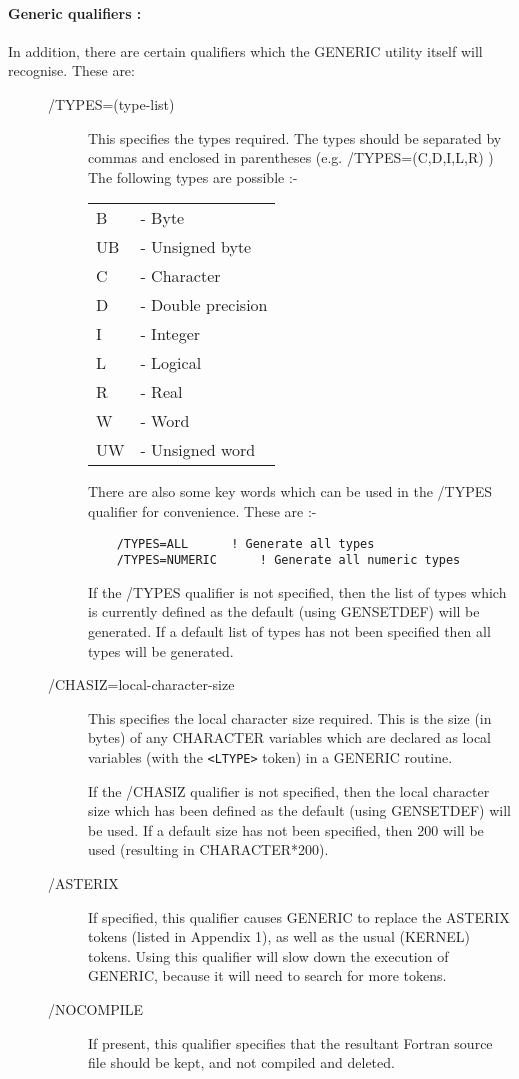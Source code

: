 \paragraph{Generic qualifiers :}
In addition, there are certain qualifiers which the
GENERIC utility itself will recognise. These are:

\begin{description}
\item[\mbox{}]\mbox{}
\begin{description}
\item[/TYPES=(type-list)]
This specifies the types required. The types should be separated
by commas and enclosed in parentheses (e.g. /TYPES=(C,D,I,L,R) )
The following types are possible :-
\begin{center}
\begin{tabular}{ll}
	B  &- Byte \\
	UB &- Unsigned byte \\
	C  &- Character \\
	D  &- Double precision \\
	I  &- Integer \\
	L  &- Logical \\
	R  &- Real \\
	W  &- Word \\
	UW &- Unsigned word \\
\end{tabular}
\end{center}
There are also some key words which can be used in the /TYPES qualifier for 
convenience. These are :-
\begin{verbatim}
	/TYPES=ALL		! Generate all types
	/TYPES=NUMERIC		! Generate all numeric types
\end{verbatim}
If the /TYPES qualifier is not specified, then the list of types which
is currently defined as the default (using GENSETDEF) will be generated.
If a default list of types has not been specified then all types will be
generated. 

\item[/CHASIZ=local-character-size]
This specifies the local character size required.
This is the size (in bytes) of any CHARACTER variables which are
declared as local variables (with the \verb+<LTYPE>+ token) in a GENERIC
routine. 

If the /CHASIZ qualifier is not specified, then the local
character size which has been defined as the default (using GENSETDEF)
will be used.
If a default size has not been specified, then 200 will be used
(resulting in CHARACTER*200).

\item[/ASTERIX]
If specified, this qualifier causes GENERIC
to replace the ASTERIX tokens (listed in Appendix 1),
as well as the usual (KERNEL) tokens.
Using this qualifier will slow down the execution of GENERIC,
because it will need to search for more tokens.

\item[/NOCOMPILE]
If present, this qualifier specifies that the resultant
Fortran source file should be kept, and not compiled and deleted.

\end{description}
\end{description}

